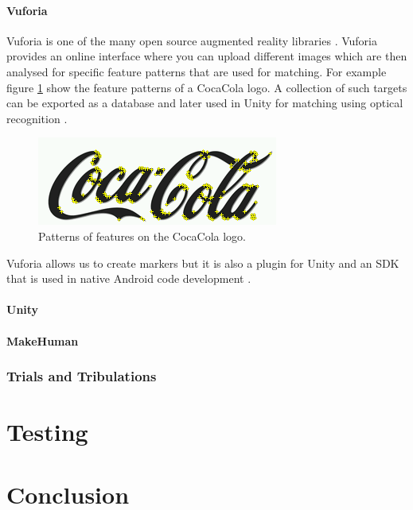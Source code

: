 \documentclass{l4proj}
\begin{document}
\subsubsection{Vuforia}
Vuforia is one of the many open source augmented reality libraries \cite{vuforia}. Vuforia provides an online interface where you can upload different images which are then analysed for specific feature patterns that are used for matching. For example figure \ref{fig:coca_cola_features} show the feature patterns of a CocaCola logo. A collection of such targets can be exported as a database and later used in Unity for matching using optical recognition \cite{vuforia_unity}.
\begin{figure}
\centering
\includegraphics[scale=1]{images/coca_cola_features.png}
\caption{Patterns of features on the CocaCola logo.}
\label{fig:coca_cola_features}
\end{figure}

Vuforia allows us to create markers but it is also a plugin for Unity and an SDK that is used in native Android code development \cite{vuforia_unity}.

\subsubsection{Unity}


\subsubsection{MakeHuman}


\subsection{Trials and Tribulations }
 
\chapter{Testing}

\chapter{Conclusion}
\end{document}
